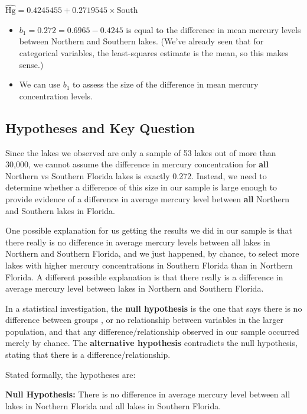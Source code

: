 \documentclass[
  letterpaper,
  DIV=11,
  numbers=noendperiod]{scrreprt}
\begin{document}
\(\widehat{\text{Hg}} = 0.4245455+0.2719545\times\text{South}\)

\begin{itemize}
\item
  \(b_1 = 0.272= 0.6965 - 0.4245\) is equal to the difference in mean
  mercury levels between Northern and Southern lakes. (We've already
  seen that for categorical variables, the least-squares estimate is the
  mean, so this makes sense.)
\item
  We can use \(b_1\) to assess the size of the difference in mean
  mercury concentration levels.
\end{itemize}

\subsection{Hypotheses and Key
Question}\label{hypotheses-and-key-question}

Since the lakes we observed are only a sample of 53 lakes out of more
than 30,000, we cannot assume the difference in mercury concentration
for \textbf{all} Northern vs Southern Florida lakes is exactly 0.272.
Instead, we need to determine whether a difference of this size in our
sample is large enough to provide evidence of a difference in average
mercury level between \textbf{all} Northern and Southern lakes in
Florida.

One possible explanation for us getting the results we did in our sample
is that there really is no difference in average mercury levels between
all lakes in Northern and Southern Florida, and we just happened, by
chance, to select more lakes with higher mercury concentrations in
Southern Florida than in Northern Florida. A different possible
explanation is that there really is a difference in average mercury
level between lakes in Northern and Southern Florida.

In a statistical investigation, the \textbf{null hypothesis} is the one
that says there is no difference between groups , or no relationship
between variables in the larger population, and that any
difference/relationship observed in our sample occurred merely by
chance. The \textbf{alternative hypothesis} contradicts the null
hypothesis, stating that there is a difference/relationship.

Stated formally, the hypotheses are:

\textbf{Null Hypothesis:} There is no difference in average mercury
level between all lakes in Northern Florida and all lakes in Southern
Florida.
\end{document}
